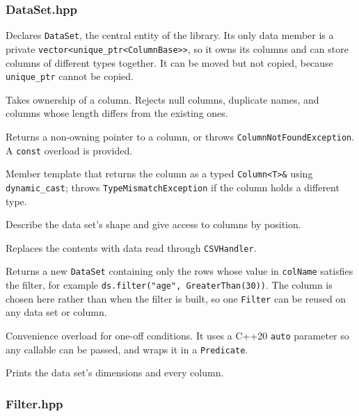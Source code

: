 \documentclass[11pt,a4paper]{article}
\newcommand{\code}[1]{\texttt{#1}}
\begin{document}
\subsubsection*{DataSet.hpp}

Declares \code{DataSet}, the central entity of the library. Its only data member is a private
\code{vector<unique\_ptr<ColumnBase>>}, so it owns its columns and can store columns of different
types together. It can be moved but not copied, because \code{unique\_ptr} cannot be copied.

\begin{description}[noitemsep,leftmargin=1.5em]
  \item[\code{addColumn(col)}] Takes ownership of a column. Rejects null columns, duplicate names,
    and columns whose length differs from the existing ones.
  \item[\code{getColumn(name)}] Returns a non-owning pointer to a column, or throws
    \code{ColumnNotFoundException}. A \code{const} overload is provided.
  \item[\code{getColumnAs<T>(name)}] Member template that returns the column as a typed
    \code{Column<T>\&} using \code{dynamic\_cast}; throws \code{TypeMismatchException} if the
    column holds a different type.
  \item[\code{rowCount()}, \code{columnCount()}, \code{columnNames()}, \code{columnAt(i)}] Describe
    the data set's shape and give access to columns by position.
  \item[\code{loadCSV(filename)}] Replaces the contents with data read through \code{CSVHandler}.
  \item[\code{filter(colName, f)}] Returns a new \code{DataSet} containing only the rows whose
    value in \code{colName} satisfies the filter, for example
    \code{ds.filter("age", GreaterThan(30))}. The column is chosen here rather than when the
    filter is built, so one \code{Filter} can be reused on any data set or column.
  \item[\code{filterBy(colName, condition)}] Convenience overload for one-off conditions. It uses
    a C++20 \code{auto} parameter so any callable can be passed, and wraps it in a
    \code{Predicate}.
  \item[\code{print()}] Prints the data set's dimensions and every column.
\end{description}

\subsubsection*{Filter.hpp}
\end{document}
